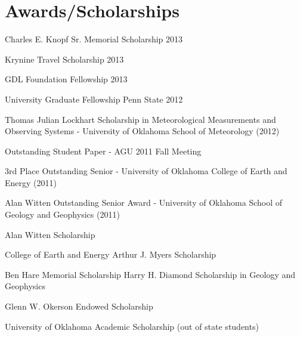 \documentclass[letterpaper]{article}
\renewenvironment{itemize}{
  \begin{list}{}{
    \setlength{\leftmargin}{1.5em}
  }
}{
  \end{list}
}
\begin{document}
\section*{Awards/Scholarships}
\begin{itemize}
\item Charles E. Knopf Sr. Memorial Scholarship 2013
\item Krynine Travel Scholarship 2013
\item GDL Foundation Fellowship 2013 
\item University Graduate Fellowship Penn State 2012
\item Thomas Julian Lockhart Scholarship in Meteorological Measurements and Observing Systems - University of Oklahoma School of Meteorology (2012)
\item Outstanding Student Paper - AGU 2011 Fall Meeting
\item 3rd Place Outstanding Senior - University of Oklahoma College of Earth and Energy (2011)
\item Alan Witten Outstanding Senior Award - University of Oklahoma School of Geology and Geophysics (2011)
\item Alan Witten Scholarship
\item College of Earth and Energy Arthur J. Myers Scholarship 
\item Ben Hare Memorial Scholarship Harry H. Diamond Scholarship in Geology and Geophysics
\item Glenn W. Okerson Endowed Scholarship 
\item University of Oklahoma Academic Scholarship (out of state students)
\end{itemize}



\end{document}
